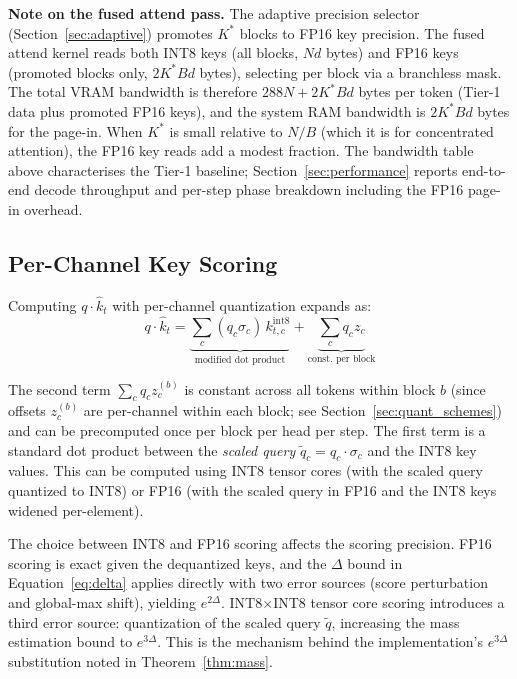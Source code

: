 \documentclass[10pt,twocolumn,a4paper]{article}
\theoremstyle{definition}
\theoremstyle{remark}
\begin{document}
\textbf{Note on the fused attend pass.}  The adaptive precision selector (Section~\ref{sec:adaptive}) promotes $K^*$ blocks to FP16 key precision.  The fused attend kernel reads both INT8 keys (all blocks, $Nd$ bytes) and FP16 keys (promoted blocks only, $2K^*Bd$ bytes), selecting per block via a branchless mask.  The total VRAM bandwidth is therefore $288N + 2K^*Bd$ bytes per token (Tier-1 data plus promoted FP16 keys), and the system RAM bandwidth is $2K^*Bd$ bytes for the page-in.  When $K^*$ is small relative to $N/B$ (which it is for concentrated attention), the FP16 key reads add a modest fraction.  The bandwidth table above characterises the Tier-1 baseline; Section~\ref{sec:performance} reports end-to-end decode throughput and per-step phase breakdown including the FP16 page-in overhead.

\subsection{Per-Channel Key Scoring}
\label{sec:scoring}

Computing $q \cdot \hat{k}_t$ with per-channel quantization expands as:
\begin{equation}
  q \cdot \hat{k}_t
  = \underbrace{\textstyle\sum_c (q_c \sigma_c)\, k_{t,c}^{\mathrm{int8}}}_{\text{modified dot product}}
  + \underbrace{\textstyle\sum_c q_c z_c}_{\text{const.\ per block}}
\end{equation}

The second term $\sum_c q_c z_c^{(b)}$ is constant across all tokens within block $b$ (since offsets $z_c^{(b)}$ are per-channel within each block; see Section~\ref{sec:quant_schemes}) and can be precomputed once per block per head per step.  The first term is a standard dot product between the \emph{scaled query} $\tilde{q}_c = q_c \cdot \sigma_c$ and the INT8 key values.  This can be computed using INT8 tensor cores (with the scaled query quantized to INT8) or FP16 (with the scaled query in FP16 and the INT8 keys widened per-element).

The choice between INT8 and FP16 scoring affects the scoring precision.  FP16 scoring is exact given the dequantized keys, and the $\Delta$ bound in Equation~\eqref{eq:delta} applies directly with two error sources (score perturbation and global-max shift), yielding $e^{2\Delta}$.  INT8$\times$INT8 tensor core scoring introduces a third error source: quantization of the scaled query $\tilde{q}$, increasing the mass estimation bound to $e^{3\Delta}$.  This is the mechanism behind the implementation's $e^{3\Delta}$ substitution noted in Theorem~\ref{thm:mass}.
\end{document}
